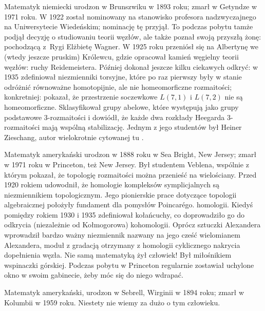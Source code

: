 \begin{remark}
    Matematyk niemiecki urodzon w Brunszwiku w 1893 roku; zmarł w Getyndze w 1971 roku.
    W 1922 został nominowany na stanowisko profesora nadzwyczajnego na Uniwersytecie Wiedeńskim; nominację tę przyjął.
    To podczas pobytu tamże podjął decyzję o studiowaniu teorii węzłów, ale także poznał swoją przyszłą żonę: pochodzącą z~Rygi Elżbietę Wagner.
    W 1925 roku przeniósł się na Albertynę we (wtedy jeszcze pruskim) Królewcu, gdzie opracował kamień węgielny teorii węzłów: ruchy Reidemeistera.
    Później dokonał jeszcze kilku ciekawych odkryć: w 1935 zdefiniował niezmienniki torsyjne, które po raz pierwszy były w stanie odróżnić równoważne homotopijnie, ale nie homeomorficzne rozmaitości; konkretniej: pokazał, że przestrzenie soczewkowe $L(7, 1)$ i $L(7, 2)$ nie są homeomorficzne.
%
%
    Sklasyfikował grupy abelowe, które występują jako grupy podstawowe 3-rozmaitości i dowiódł, że każde dwa rozkłady Heegarda 3-rozmaitości mają wspólną stabilizację.
%
%
    Jednym z jego studentów był Heiner Zieschang, autor wielokrotnie cytowanej tu \cite{burde2014}.
\end{remark}

\begin{remark}
    Matematyk amerykański urodzon w 1888 roku w Sea Bright, New Jersey; zmarł w 1971 roku w Princeton, też New Jersey.
    Był studentem Veblena, wspólnie z którym pokazał, że topologię rozmaitości można przenieść na wielościany.
    Przed 1920 rokiem udowodnił, że homologie kompleksów symplicjalnych są niezmiennikiem topologicznym.
    Jego pionierskie prace dotyczące topologii algebraicznej położyły fundament dla pomysłów Poincarégo.
    homologii.
    Kiedyś pomiędzy rokiem 1930 i 1935 zdefiniował kołańcuchy, co doprowadziło go do odkrycia (niezależnie od Kołmogorowa) kohomologii.
    Oprócz sztuczki Alexandera wprowadził bardzo ważny niezmiennik nazwany na jego cześć wielomianem Alexandera, moduł z gradacją otrzymany z homologii cyklicznego nakrycia dopełnienia węzła.
    Nie samą matematyką żył człowiek!
    Był miłośnikiem wspinaczki górskiej.
    Podczas pobytu w Princeton regularnie zostawiał uchylone okno w swoim gabinecie, żeby móc się do niego wdrapać.
\end{remark}

\begin{remark}
    Matematyk amerykański, urodzon w Sebrell, Wirginii w 1894 roku; zmarł w Kolumbii w 1959 roku.
    Niestety nie wiemy za dużo o tym człowieku.
\end{remark}

